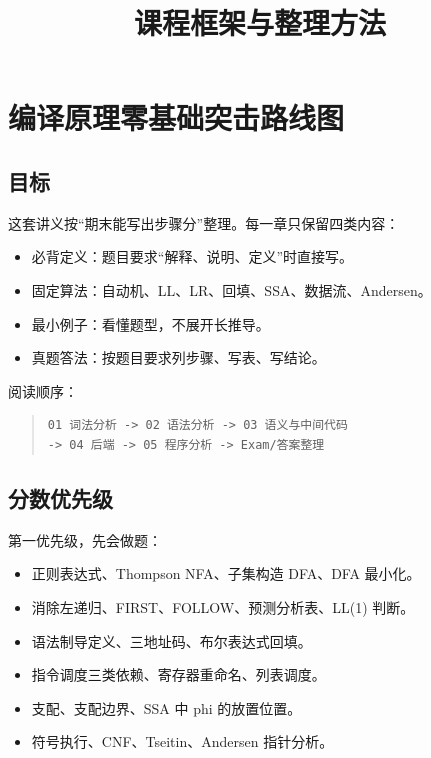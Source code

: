 \documentclass[UTF8,zihao=-4]{ctexart}
\title{课程框架与整理方法}
\author{}
\date{}
\begin{document}
\maketitle
\setcounter{tocdepth}{1}
\tableofcontents
\newpage
\section{编译原理零基础突击路线图}


\subsection{目标}


这套讲义按“期末能写出步骤分”整理。每一章只保留四类内容：


\begin{itemize}
\item 必背定义：题目要求“解释、说明、定义”时直接写。
\item 固定算法：自动机、LL、LR、回填、SSA、数据流、Andersen。
\item 最小例子：看懂题型，不展开长推导。
\item 真题答法：按题目要求列步骤、写表、写结论。
\end{itemize}


阅读顺序：


\begin{quote}
\footnotesize
\begin{verbatim}
01 词法分析 -> 02 语法分析 -> 03 语义与中间代码
-> 04 后端 -> 05 程序分析 -> Exam/答案整理
\end{verbatim}
\end{quote}


\subsection{分数优先级}


第一优先级，先会做题：


\begin{itemize}
\item 正则表达式、Thompson NFA、子集构造 DFA、DFA 最小化。
\item 消除左递归、FIRST、FOLLOW、预测分析表、LL(1) 判断。
\item 语法制导定义、三地址码、布尔表达式回填。
\item 指令调度三类依赖、寄存器重命名、列表调度。
\item 支配、支配边界、SSA 中 phi 的放置位置。
\item 符号执行、CNF、Tseitin、Andersen 指针分析。
\end{itemize}
\end{document}
